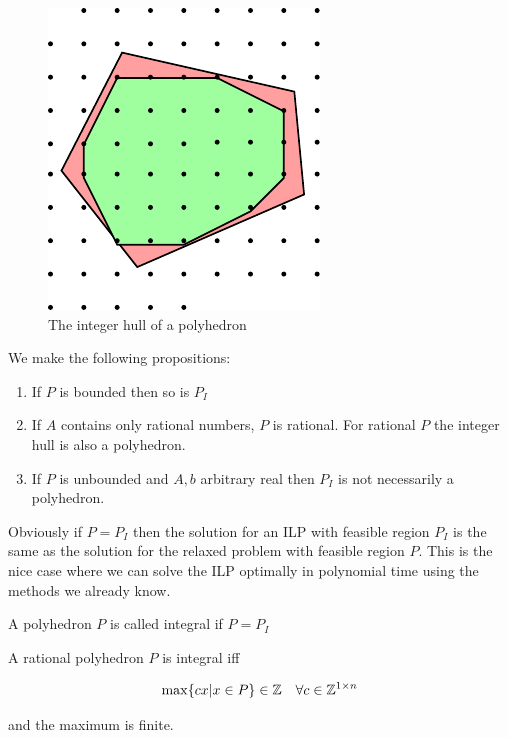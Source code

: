 \begin{figure}[hbt]
\begin{center}
\includegraphics{./images/integerHull}
\end{center}
\caption{The integer hull of a polyhedron}
\label{Fig:integerHull}
\end{figure}

We make the following propositions:

\begin{enumerate}
\item If $P$ is bounded then so is $P_I$
\item If $A$ contains only rational numbers, $P$ is rational. For rational $P$ the integer hull is also a polyhedron.
\item If $P$ is unbounded and $A,b$ arbitrary real then $P_I$ is not necessarily a polyhedron.
\end{enumerate}

Obviously if $P=P_I$ then the solution for an ILP with feasible region $P_I$ is the same as the solution for the relaxed problem with feasible region $P$. This is the nice case where we can solve the ILP optimally in polynomial time using the methods we already know.

\begin{Def} A polyhedron $P$ is called integral if $P=P_I$\end{Def}

\begin{thm}\label{Thm:polyIntegrality} A rational polyhedron $P$ is integral iff

\[\max \{cx | x\in P\}\in \mathbb{Z}\quad \forall c\in \mathbb{Z}^{1\times n}\]

and the maximum is finite.
\end{thm}

